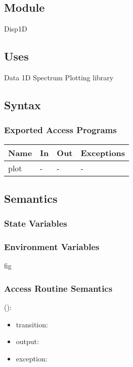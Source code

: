\documentclass[12pt, titlepage]{article}
\begin{document}
\subsection{Module}

Disp1D

\subsection{Uses}
Data 1D Spectrum
Plotting library

\subsection{Syntax}

\subsubsection{Exported Access Programs}

\begin{center}
\begin{tabular}{p{2cm} p{4cm} p{4cm} p{2cm}}
\hline
\textbf{Name} & \textbf{In} & \textbf{Out} & \textbf{Exceptions} \\
\hline
plot & - & - & - \\
\hline
\end{tabular}
\end{center}

\subsection{Semantics}

\subsubsection{State Variables}

\subsubsection{Environment Variables}
fig

\subsubsection{Access Routine Semantics}

\noindent {}():
\begin{itemize}
\item transition:  
\item output:  
\item exception:  
\end{itemize}
\end{document}
